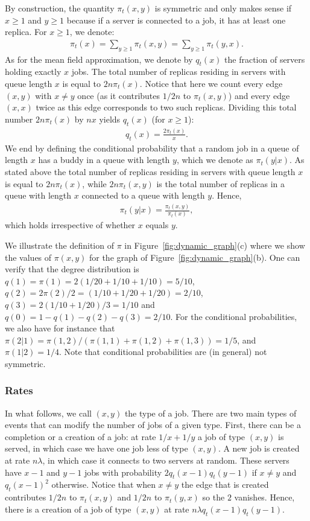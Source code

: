 \documentclass[acmsmall,nonacm]{acmart}
\begin{document}
By construction, the quantity $\pi_t(x,y)$ is symmetric and only makes sense if $x\ge1$ and $y\ge1$ because if a server is connected to a job, it has at least one replica. For $x\ge1$, we denote:
\begin{align}
    \label{eq:pi(x)}
    \pi_t(x) = \sum_{y \geq 1} \pi_t(x,y) = \sum_{y \geq 1} \pi_t(y,x).
\end{align}
As for the mean field approximation, we denote by $q_t(x)$ the fraction of servers holding exactly $x$ jobs. The total number of replicas residing in servers with queue length $x$ is equal to $2n\pi_t(x)$. Notice that here we count every edge $(x,y)$ 
with $x \not= y$ once (as it contributes $1/2n$ to $\pi_t(x,y)$) and every edge $(x,x)$ twice as this edge corresponds to
two such replicas. Dividing this total number $2n\pi_t(x)$ by $nx$ yields $q_t(x)$ (for $x\ge1$):
\begin{align}
    \label{eq:q_from_pi}
    q_t(x) = \frac{2\pi_t(x)}{x}.
\end{align}
We end by defining the conditional probability that a random job in a queue of length $x$ has a buddy in a queue with length $y$,
which we denote as $\pi_t(y|x)$.  As stated above the total number of replicas residing in servers with queue length $x$ is equal to $2n\pi_t(x)$, while $2n \pi_t(x,y)$ is the total number of replicas in a queue with length $x$ connected to a queue with length $y$.
Hence,
\begin{align}\label{eq:condpi}
    \pi_t(y|x) = \frac{\pi_t(x,y)}{\pi_t(x)},
\end{align}
which holds irrespective of whether $x$ equals $y$.

We illustrate the definition of $\pi$ in Figure~\ref{fig:dynamic_graph}(c) where we show the values of $\pi(x,y)$ for the graph of Figure~\ref{fig:dynamic_graph}(b). 
One can verify that the degree distribution is $q(1)=\pi(1)=2(1/20+1/10+1/10)=5/10$, $q(2)=2\pi(2)/2=(1/10+1/20+1/20)=2/10$, $q(3)=2(1/10+1/20)/3=1/10$ and $q(0)=1-q(1)-q(2)-q(3)=2/10$. For the conditional probabilities, we also have for instance that $\pi(2|1)=\pi(1,2)/(\pi(1,1)+\pi(1,2)+\pi(1,3))=1/5$, and $\pi(1|2)=1/4$. Note that conditional probabilities are (in general) not symmetric.


\subsubsection{Rates}

In what follows, we call $(x,y)$ the type of a job. There are two main types of events that can modify the number of jobs of a given type.  First, there can be a completion or a creation of a job: at rate $1/x+1/y$ a job of type $(x,y)$ is served, in which case we have one job less of type $(x,y)$. A new job is created at rate $n\lambda$, in which case it connects to two servers at random. These servers have $x-1$ and $y-1$ jobs with probability $2q_t(x-1)q_t(y-1)$ if $x\not= y$ and $q_t(x-1)^2$ otherwise.  Notice that when $x \not= y$  the edge that is created contributes $1/2n$ to $\pi_t(x,y)$ and $1/2n$ to $\pi_t(y,x)$ so the $2$
vanishes. Hence, there is a creation of a job of type $(x,y)$ at rate $n\lambda q_t(x-1)q_t(y-1)$.
\end{document}
